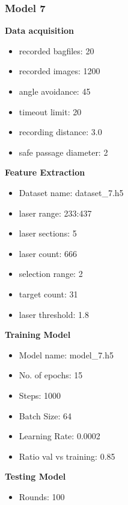 \subsubsection{Model 7\label{model_7} }
\begin{multicols}{2}\textbf{Data acquisition}
\begin{itemize}
\setlength\itemsep{0.1em}
\item recorded bagfiles: 20
\item recorded images: 1200
\item angle avoidance: 45
\item timeout limit: 20
\item recording distance: 3.0
\item safe passage diameter: 2
\end{itemize}
\textbf{Feature Extraction}
\begin{itemize}
\setlength\itemsep{0.1em}
\item Dataset name: dataset\_7.h5
\item  laser range: 233:437
\item  laser sections: 5
\item  laser count: 666
\item  selection range: 2
\item  target count: 31
\item  laser threshold: 1.8
\end{itemize}
\columnbreak\textbf{Training Model}
\begin{itemize}
\setlength\itemsep{0.1em}
\item  Model name: model\_7.h5
\item  No. of epochs: 15
\item  Steps: 1000
\item  Batch Size: 64
\item  Learning Rate: 0.0002
\item  Ratio val vs training: 0.85
\end{itemize}
\textbf{Testing Model}
\begin{itemize}
\setlength\itemsep{0.1em}
\item Rounds: 100
\newline
\newline
\newline
\newline
\newline
\newline
\newline
\newline
\end{itemize}

\end{multicols}
